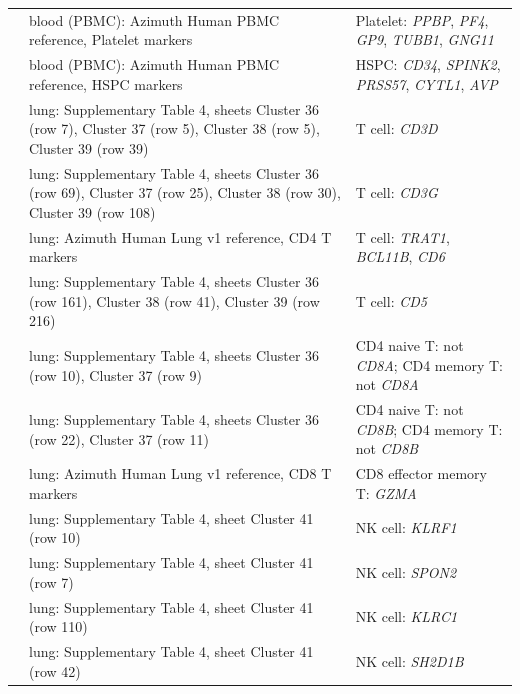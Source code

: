\begin{longtable}{@{}>{\raggedright\arraybackslash}p{2.0cm} >{\raggedright\arraybackslash}p{4.6cm} >{\raggedright\arraybackslash}p{8.4cm}@{}}
\cite{haoIntegratedAnalysisMultimodal2021} & blood (PBMC): Azimuth Human PBMC reference, Platelet markers & Platelet: \textit{PPBP}, \textit{PF4}, \textit{GP9}, \textit{TUBB1}, \textit{GNG11} \\
\cite{haoIntegratedAnalysisMultimodal2021} & blood (PBMC): Azimuth Human PBMC reference, HSPC markers & HSPC: \textit{CD34}, \textit{SPINK2}, \textit{PRSS57}, \textit{CYTL1}, \textit{AVP} \\
\cite{travagliniMolecularCellAtlas2020} & lung: Supplementary Table 4, sheets Cluster 36 (row 7), Cluster 37 (row 5), Cluster 38 (row 5), Cluster 39 (row 39) & T cell: \textit{CD3D} \\
\cite{travagliniMolecularCellAtlas2020} & lung: Supplementary Table 4, sheets Cluster 36 (row 69), Cluster 37 (row 25), Cluster 38 (row 30), Cluster 39 (row 108) & T cell: \textit{CD3G} \\
\cite{travagliniMolecularCellAtlas2020} & lung: Azimuth Human Lung v1 reference, CD4 T markers & T cell: \textit{TRAT1}, \textit{BCL11B}, \textit{CD6} \\
\cite{travagliniMolecularCellAtlas2020} & lung: Supplementary Table 4, sheets Cluster 36 (row 161), Cluster 38 (row 41), Cluster 39 (row 216) & T cell: \textit{CD5} \\
\cite{travagliniMolecularCellAtlas2020} & lung: Supplementary Table 4, sheets Cluster 36 (row 10), Cluster 37 (row 9) & CD4 naive T: not \textit{CD8A}; CD4 memory T: not \textit{CD8A} \\
\cite{travagliniMolecularCellAtlas2020} & lung: Supplementary Table 4, sheets Cluster 36 (row 22), Cluster 37 (row 11) & CD4 naive T: not \textit{CD8B}; CD4 memory T: not \textit{CD8B} \\
\cite{travagliniMolecularCellAtlas2020} & lung: Azimuth Human Lung v1 reference, CD8 T markers & CD8 effector memory T: \textit{GZMA} \\
\cite{travagliniMolecularCellAtlas2020} & lung: Supplementary Table 4, sheet Cluster 41 (row 10) & NK cell: \textit{KLRF1} \\
\cite{travagliniMolecularCellAtlas2020} & lung: Supplementary Table 4, sheet Cluster 41 (row 7) & NK cell: \textit{SPON2} \\
\cite{travagliniMolecularCellAtlas2020} & lung: Supplementary Table 4, sheet Cluster 41 (row 110) & NK cell: \textit{KLRC1} \\
\cite{travagliniMolecularCellAtlas2020} & lung: Supplementary Table 4, sheet Cluster 41 (row 42) & NK cell: \textit{SH2D1B} \\

\end{longtable}
